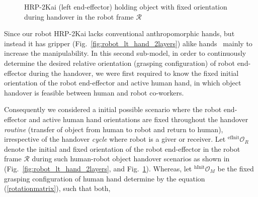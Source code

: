 \begin{figure}[htpb]
	\caption{HRP-2Kai (left end-effector) holding object with fixed orientation during handover in the robot frame $\mathcal{R}$}
	\label{fig:robot_lt_hand_obj}
\end{figure} 


Since our robot HRP-2Kai lacks conventional anthropomorphic hands, but instead it has gripper (Fig.~\ref{fig:robot_lt_hand_2layers}) alike hands~\cite{kaneko2015humanoid, stasse2019overview} mainly to increase the manipulability. In this second sub-model, in order to continuously determine the desired relative orientation (grasping configuration) of robot end-effector during the handover, we were first required to know the fixed initial orientation of the robot end-effector and active human hand, in which object handover is feasible between human and robot co-workers. 

Consequently we considered a initial possible scenario where the robot end-effector and active human hand orientations are fixed throughout the handover \textit{routine} (transfer of object from human to robot and return to human), irrespective of the handover \textit{cycle} where robot is a giver or receiver. Let ${{}^\text{efInit}\mathcal{O}_R}$ denote the initial and fixed orientation of the robot end-effector in the robot frame $\mathcal{R}$ during such human-robot object handover scenarios as shown in (Fig.~\ref{fig:robot_lt_hand_2layers}, and Fig.~\ref{fig:robot_lt_hand_obj}). Whereas, let ${{}^\text{hInit}\mathcal{O}_M}$ be the fixed grasping configuration of human hand determine by the equation (\ref{rotationmatrix}), such that both,

